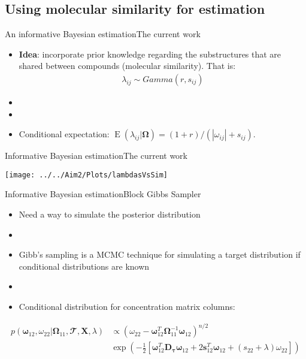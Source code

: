 \documentclass[xcolor=dvipsnames]{beamer}
\DeclareMathOperator{\EE}{E}
\begin{document}
\subsection{Using molecular similarity for estimation}

\begin{frame}{An informative Bayesian estimation}{The current work}
	\vspace{-15.5pt}
	\begin{itemize}
		\item \textbf{Idea}:  incorporate prior knowledge regarding the substructures that are shared between compounds (molecular similarity). That is:
		\begin{align*}
			\lambda_{ij}\sim Gamma(r,s_{ij})
		\end{align*}\pause
		\item[]
		\item[]
		\item Conditional expectation: $\EE(\lambda_{ij}|\boldsymbol{\Omega})=(1+r)/(|\omega_{ij} |+s_{ij})$.
	\end{itemize}
\end{frame}

\begin{frame}{Informative Bayesian estimation}{The current work}
	\begin{center}
			\texttt{[image: ../../Aim2/Plots/lambdasVsSim]}
	\end{center}
\end{frame}

\begin{frame}{Informative Bayesian estimation}{Block Gibbs Sampler}
	\vspace{-10.5pt}
	\begin{itemize}
		\item Need a way to simulate the posterior distribution \pause
		\item[]
		\item Gibb's sampling is a MCMC technique for simulating a target distribution if conditional distributions are known \pause
		\item[]
		\item Conditional distribution for concentration matrix columns:
	\end{itemize}
	\begin{align*}
	p(\boldsymbol{\omega}_{12}, \omega_{22}|\boldsymbol{\Omega}_{11},\mathbfcal{T},\textbf{X},\lambda) & \propto \left(\omega_{22}-\boldsymbol{\omega}_{12}^T \boldsymbol{\Omega}_{11}^{-1}\boldsymbol{\omega}_{12} \right)^{n/2} \\ &\exp \left( - \frac{1}{2}\left[ \boldsymbol{\omega}_{12}^T \textbf{D}_{\boldsymbol{\tau}} \boldsymbol{\omega}_{12}+ 2 
	\textbf{s}_{12}^T \boldsymbol{\omega}_{12} + (s_{22}+\lambda)\omega_{22}\right] \right)
	\end{align*}
\end{frame}
\end{document}
